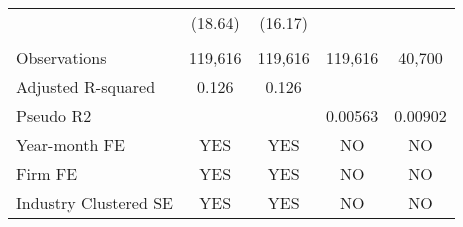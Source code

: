 \begin{table}[H]
\begin{tabular}{lcccc}
		& (18.64) & (16.17) &   &  \\
		&   &   &   &  \\
		Observations & 119,616 & 119,616 & 119,616 & 40,700 \\
		Adjusted R-squared & 0.126 & 0.126 &   &  \\
		Pseudo R2 &   &   & 0.00563 & 0.00902 \\
		Year-month FE & YES & YES & NO & NO \\
		Firm FE & YES & YES & NO & NO \\
		Industry Clustered SE & YES & YES & NO & NO \\
		\bottomrule
		\bottomrule
	\end{tabular}%
\end{table}%
